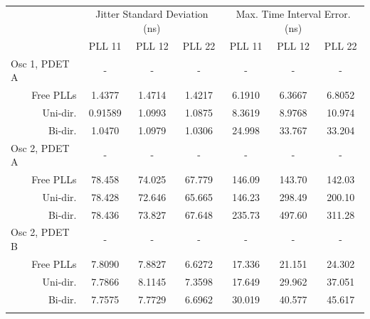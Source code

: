 \documentclass[conference]{IEEEtran}
\newcommand\T{\rule{0pt}{2.6ex}}       %
\newcommand\B{\rule[-1.2ex]{0pt}{0pt}} %
\begin{document}
\begin{table}[!ht]
    \begin{center}
        \begin{tiny}
        	\setlength{\tabcolsep}{.9\tabcolsep}
            \begin{tabular}{cc|c|c|c|c|c|c|}           
                \cline{3-8}
                && \multicolumn{3}{c|}{Jitter Standard Deviation (ns)} & \multicolumn{3}{c|}{Max. Time Interval Error. (ns)} \T\\
                \cline{3-8} 
                &&PLL 11&PLL 12&PLL 22&PLL 11&PLL 12&PLL 22\T\\
                \hline
                \multicolumn{2}{|l|}{Osc 1, PDET A}&-&-&-&-&-&-\T\\
                \multicolumn{2}{|r|}{Free PLLs} &1.4377 &1.4714&1.4217  &6.1910&6.3667&6.8052 \T\\
                \multicolumn{2}{|r|}{Uni-dir.}  &0.91589&1.0993&1.0875  &8.3619&8.9768&10.974 \T\\
                \multicolumn{2}{|r|}{Bi-dir.}   &1.0470 &1.0979&1.0306  &24.998&33.767&33.204 \T\\
                \hline
                \multicolumn{2}{|l|}{Osc 2, PDET A}&-&-&-&-&-&-\T\\
                \multicolumn{2}{|r|}{Free PLLs} &78.458&74.025&67.779  &146.09&143.70&142.03 \T\\
                \multicolumn{2}{|r|}{Uni-dir.}  &78.428&72.646&65.665  &146.23&298.49&200.10 \T\\
                \multicolumn{2}{|r|}{Bi-dir.}   &78.436&73.827&67.648  &235.73&497.60&311.28 \T\\
                \hline
                \multicolumn{2}{|l|}{Osc 2, PDET B}&-&-&-&-&-&-\T\\
                \multicolumn{2}{|r|}{Free PLLs} &7.8090&7.8827&6.6272   &17.336&21.151&24.302 \T\\
                \multicolumn{2}{|r|}{Uni-dir.}  &7.7866&8.1145&7.3598   &17.649&29.962&37.051 \T\\
                \multicolumn{2}{|r|}{Bi-dir.}   &7.7575&7.7729&6.6962   &30.019&40.577&45.617 \T\\
                \hline
                \B
            \end{tabular}
        \end{tiny}
        \caption{}
        \label{table:b_c_perf}
    \end{center}
\vspace{-0.5cm}
\end{table}
\end{document}
